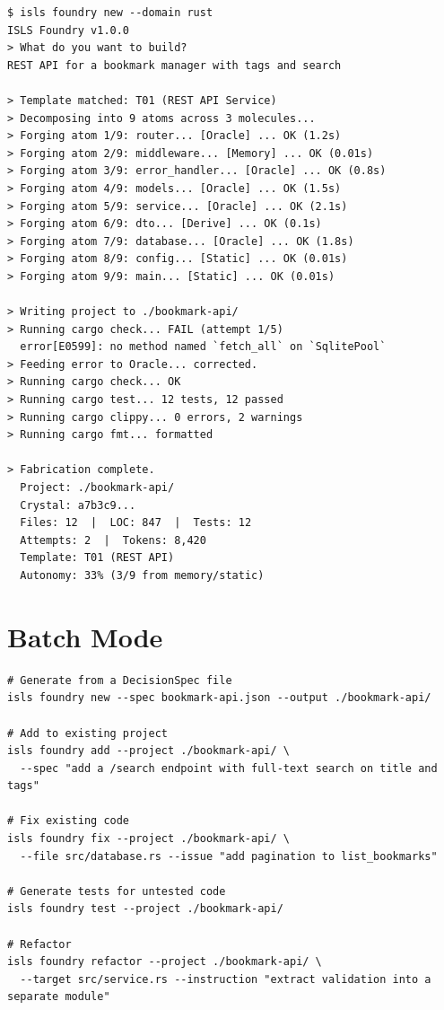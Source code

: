 \documentclass[11pt,a4paper,twoside]{article}
\theoremstyle{definition}
\theoremstyle{plain}
\theoremstyle{remark}
\begin{document}
\begin{lstlisting}[title={Interactive fabrication session}]
$ isls foundry new --domain rust
ISLS Foundry v1.0.0
> What do you want to build?
REST API for a bookmark manager with tags and search

> Template matched: T01 (REST API Service)
> Decomposing into 9 atoms across 3 molecules...
> Forging atom 1/9: router... [Oracle] ... OK (1.2s)
> Forging atom 2/9: middleware... [Memory] ... OK (0.01s)
> Forging atom 3/9: error_handler... [Oracle] ... OK (0.8s)
> Forging atom 4/9: models... [Oracle] ... OK (1.5s)
> Forging atom 5/9: service... [Oracle] ... OK (2.1s)
> Forging atom 6/9: dto... [Derive] ... OK (0.1s)
> Forging atom 7/9: database... [Oracle] ... OK (1.8s)
> Forging atom 8/9: config... [Static] ... OK (0.01s)
> Forging atom 9/9: main... [Static] ... OK (0.01s)

> Writing project to ./bookmark-api/
> Running cargo check... FAIL (attempt 1/5)
  error[E0599]: no method named `fetch_all` on `SqlitePool`
> Feeding error to Oracle... corrected.
> Running cargo check... OK
> Running cargo test... 12 tests, 12 passed
> Running cargo clippy... 0 errors, 2 warnings
> Running cargo fmt... formatted

> Fabrication complete.
  Project: ./bookmark-api/
  Crystal: a7b3c9...
  Files: 12  |  LOC: 847  |  Tests: 12
  Attempts: 2  |  Tokens: 8,420
  Template: T01 (REST API)
  Autonomy: 33% (3/9 from memory/static)
\end{lstlisting}

\section{Batch Mode}\label{sec:batch}

\begin{lstlisting}
# Generate from a DecisionSpec file
isls foundry new --spec bookmark-api.json --output ./bookmark-api/

# Add to existing project
isls foundry add --project ./bookmark-api/ \
  --spec "add a /search endpoint with full-text search on title and tags"

# Fix existing code
isls foundry fix --project ./bookmark-api/ \
  --file src/database.rs --issue "add pagination to list_bookmarks"

# Generate tests for untested code
isls foundry test --project ./bookmark-api/

# Refactor
isls foundry refactor --project ./bookmark-api/ \
  --target src/service.rs --instruction "extract validation into a separate module"
\end{lstlisting}
\end{document}
